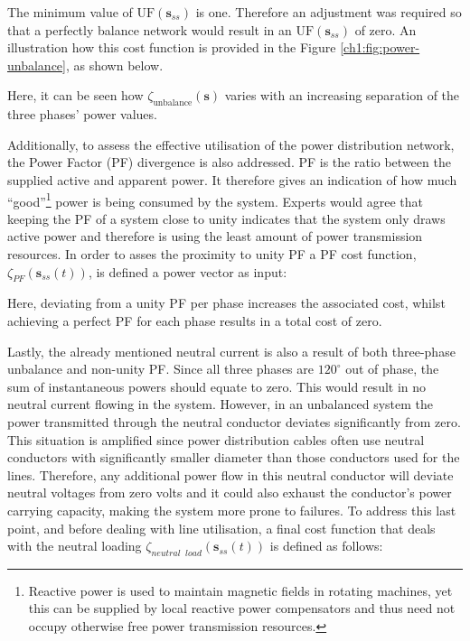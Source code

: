 

The minimum value of $\text{UF}(\textbf{s}_{ss})$ is one.
Therefore an adjustment was required so that a perfectly balance network would result in an $\text{UF}(\textbf{s}_{ss})$ of zero.
An illustration how this cost function is provided in the Figure \ref{ch1:fig:power-unbalance}, as shown below.



Here, it can be seen how $\zeta_\text{unbalance}(\textbf{s})$ varies with an increasing separation of the three phases' power values.

Additionally, to assess the effective utilisation of the power distribution network, the Power Factor (PF) divergence is also addressed.
PF is the ratio between the supplied active and apparent power.
It therefore gives an indication of how much ``good''\footnote[1]{Reactive power is used to maintain magnetic fields in rotating machines, yet this can be supplied by local reactive power compensators and thus need not occupy otherwise free power transmission resources.} power is being consumed by the system.
Experts would agree that keeping the PF of a system close to unity indicates that the system only draws active power and therefore is using the least amount of power transmission resources.
In order to asses the proximity to unity PF a PF cost function, $\zeta_{PF}(\textbf{s}_{ss}(t))$, is defined a power vector as input:



Here, deviating from a unity PF per phase increases the associated cost, whilst achieving a perfect PF for each phase results in a total cost of zero.

Lastly, the already mentioned neutral current is also a result of both three-phase unbalance and non-unity PF.
Since all three phases are $120^\circ$ out of phase, the sum of instantaneous powers should equate to zero.
This would result in no neutral current flowing in the system.
However, in an unbalanced system the power transmitted through the neutral conductor deviates significantly from zero.
This situation is amplified since power distribution cables often use neutral conductors with significantly smaller diameter than those conductors used for the lines.
Therefore, any additional power flow in this neutral conductor will deviate neutral voltages from zero volts and it could also exhaust the conductor's power carrying capacity, making the system more prone to failures.
To address this last point, and before dealing with line utilisation, a final cost function that deals with the neutral loading $\zeta_{neutral\;\;load}(\textbf{s}_{ss}(t))$ is defined as follows:

